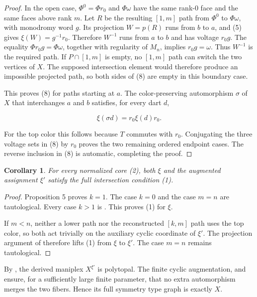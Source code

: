 \documentclass[11pt]{article}
\newtheorem{corollary}[theorem]{Corollary}
\begin{document}
\begin{proof}
In the open case, $\Phi^0=\Phi r_0$ and $\Phi\omega$ have the same rank-$0$ face and the same faces
above rank $m$. Let $R$ be the resulting $[1,m]$ path from $\Phi^0$ to $\Phi\omega$, with monodromy
word $g$. Its projection $W=p(R)$ runs from $b$ to $a$, and (5) gives
$\xi(W)=g^{-1}r_0$. Therefore $W^{-1}$ runs from $a$ to $b$ and has voltage $r_0g$.
The equality $\Phi r_0g=\Phi\omega$, together with regularity of $M_n$, implies $r_0g=\omega$.
Thus $W^{-1}$ is the required path. If $P\cap[1,m]$ is empty, no $[1,m]$ path can switch the two
vertices of $X$. The supposed intersection element would therefore produce an impossible projected
path, so both sides of (8) are empty in this boundary case.

This proves (8) for paths starting at $a$. The color-preserving automorphism $\sigma$ of $X$ that
interchanges $a$ and $b$ satisfies, for every dart $d$,

\[
\xi(\sigma d)=r_0\xi(d)r_0.
\tag{9}
\]

For the top color this follows because $T$ commutes with $r_0$. Conjugating the three voltage sets in
(8) by $r_0$ proves the two remaining ordered endpoint cases. The reverse inclusion in (8) is
automatic, completing the proof.
\end{proof}

\begin{corollary}

For every normalized core (2), both $\xi$ and the augmented assignment $\xi'$ satisfy the full
intersection condition (1).

\end{corollary}

\begin{proof}

Proposition 5 proves $k=1$. The case $k=0$ and the case $m=n$ are tautological. Every case $k>1$
is \cite[Theorem 6.4]{mochan2024}. This proves (1) for $\xi$.

If $m<n$, neither a lower path nor the reconstructed $[k,m]$ path uses the top color, so both act
trivially on the auxiliary cyclic coordinate of $\xi'$. The projection argument of
\cite[Corollary 6.5]{mochan2024} therefore lifts (1) from $\xi$ to $\xi'$. The case $m=n$ remains
tautological.
\end{proof}

By \cite[Theorem 4.2]{hm2023}, the derived maniplex $X^{\xi'}$ is polytopal. The finite cyclic augmentation,
\cite[Propositions 19 and 20]{ppt2019} and \cite[Theorems 29 and 31]{ppt2019} ensure, for a sufficiently large finite
parameter, that no extra automorphism merges the two fibers. Hence its full symmetry type graph is
exactly $X$.
\end{document}
